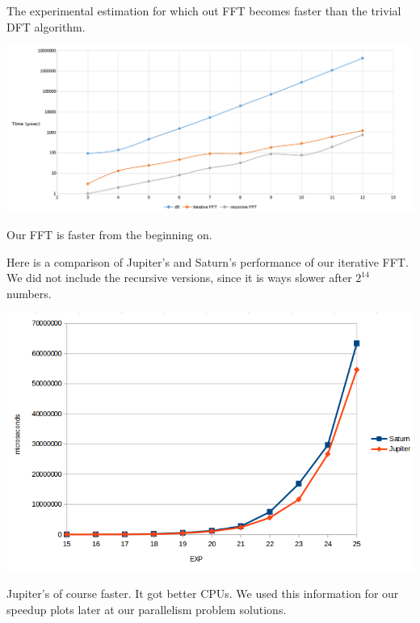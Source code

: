 The experimental estimation for which out FFT becomes faster than the trivial DFT algorithm. 
\begin{center}
\includegraphics[width=\textwidth]{dft_comp.png}
\end{center}
Our FFT is faster from the beginning on.

Here is a comparison of Jupiter's and Saturn's performance of our iterative FFT. We did not include the recursive versions, since it is ways slower after \(2^{14}\) numbers.
\begin{center}
\includegraphics[width=\textwidth]{seq_performance.png}
\end{center}
Jupiter's of course faster. It got better CPUs. We used this information for our speedup plots later at our parallelism problem solutions.
